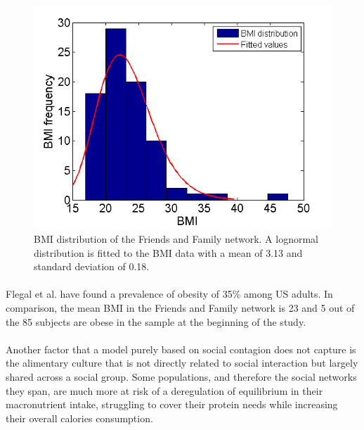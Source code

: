 \documentclass[11pt]{article}
\begin{document}
\begin{figure}[H]
\center
   \includegraphics[scale = 0.9]{bmi_distribution_figure4.png}
   \caption{\label{4} BMI distribution of the Friends and Family network. A lognormal distribution is fitted to the BMI data with a mean of 3.13 and standard deviation of 0.18.}
\end{figure}

\paragraph{}
Flegal et al. have found a prevalence of obesity of 35\% among US adults. In comparison, the mean BMI in the Friends and Family network is 23 and 5 out of the 85 subjects are obese in the sample at the beginning of the study.

\paragraph{}

Another factor that a model purely based on social contagion does not capture is the alimentary culture that is not directly related to social interaction but largely shared across a social group. Some populations, and therefore the social networks they span, are much more at risk of a deregulation of equilibrium in their macronutrient intake, struggling to cover their protein needs while increasing their overall calories consumption. 
\end{document}

